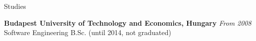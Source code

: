 \documentclass{resume} %
\begin{document}

\begin{rSection}{Studies}

{\bf Budapest University of Technology and Economics, Hungary} \hfill {\em From 2008} \\
Software Engineering B.Sc. (until 2014, not graduated) \smallskip
\end{rSection}

\end{document}
